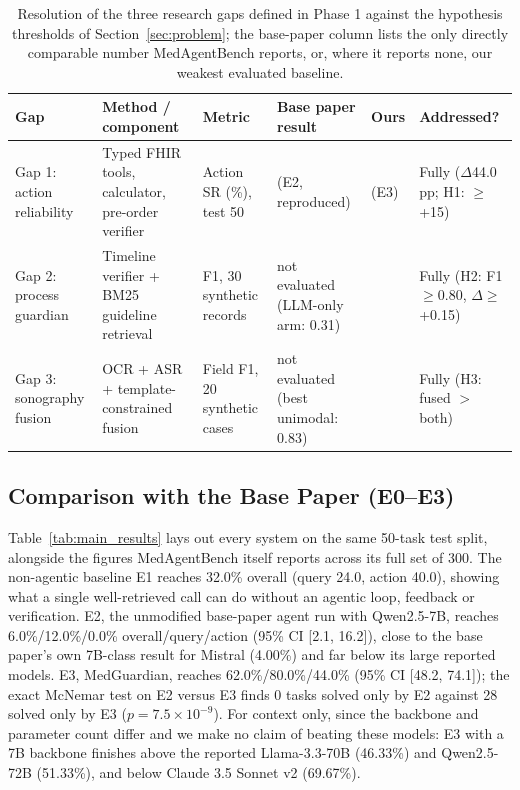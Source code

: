 \documentclass[conference]{IEEEtran}
\begin{document}
\begin{table}[t]
\centering
\small
\caption{Resolution of the three research gaps defined in Phase 1 against the hypothesis thresholds of Section~\ref{sec:problem}; the base-paper column lists the only directly comparable number MedAgentBench reports, or, where it reports none, our weakest evaluated baseline.}
\label{tab:gap_resolution}
\begin{tabular}{@{}>{\raggedright\arraybackslash}p{2.6cm}>{\raggedright\arraybackslash}p{3.4cm}>{\raggedright\arraybackslash}p{2.7cm}>{\raggedright\arraybackslash}p{3.0cm}>{\raggedright\arraybackslash}p{1.3cm}>{\raggedright\arraybackslash}p{3.0cm}@{}}
\toprule
\textbf{Gap} & \textbf{Method / component} & \textbf{Metric} & \textbf{Base paper result} & \textbf{Ours} & \textbf{Addressed?} \\
\midrule
Gap 1: action reliability & Typed FHIR tools, calculator, pre-order verifier & Action SR (\%), test 50 & 0.0 (E2, reproduced) & 44.0 (E3) & Fully ($\Delta$44.0 pp; H1: $\geq$+15) \\
Gap 2: process guardian & Timeline verifier + BM25 guideline retrieval & F1, 30 synthetic records & not evaluated (LLM-only arm: 0.31) & 1.00 & Fully (H2: F1$\geq$0.80, $\Delta\geq$+0.15) \\
Gap 3: sonography fusion & OCR + ASR + template-constrained fusion & Field F1, 20 synthetic cases & not evaluated (best unimodal: 0.83) & 1.00 & Fully (H3: fused $>$ both) \\
\bottomrule
\end{tabular}
\end{table}

\subsection{Comparison with the Base Paper (E0--E3)}
Table~\ref{tab:main_results} lays out every system on the same 50-task test split, alongside the figures MedAgentBench itself reports across its full set of 300. The non-agentic baseline E1 reaches 32.0\% overall (query 24.0, action 40.0), showing what a single well-retrieved call can do without an agentic loop, feedback or verification. E2, the unmodified base-paper agent run with Qwen2.5-7B, reaches 6.0\%/12.0\%/0.0\% overall/query/action (95\% CI [2.1, 16.2]), close to the base paper's own 7B-class result for Mistral (4.00\%) and far below its large reported models. E3, MedGuardian, reaches 62.0\%/80.0\%/44.0\% (95\% CI [48.2, 74.1]); the exact McNemar test on E2 versus E3 finds 0 tasks solved only by E2 against 28 solved only by E3 ($p=7.5\times10^{-9}$). For context only, since the backbone and parameter count differ and we make no claim of beating these models: E3 with a 7B backbone finishes above the reported Llama-3.3-70B (46.33\%) and Qwen2.5-72B (51.33\%), and below Claude 3.5 Sonnet v2 (69.67\%).
\end{document}
